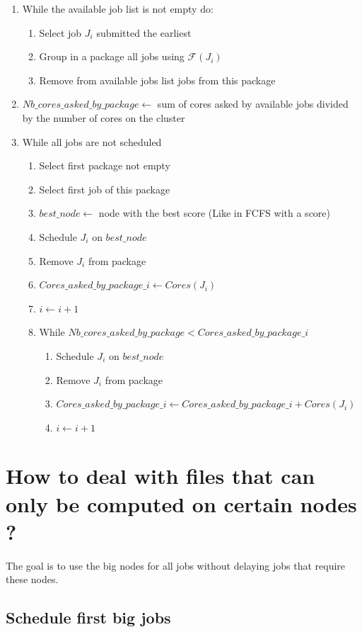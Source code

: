 \documentclass[a4paper]{article}
\newcommand{\inputs}{\ensuremath{\mathcal{F}}\xspace}
\begin{document}
\begin{enumerate}
	\item While the available job list is not empty do:
	\begin{enumerate}
		\item Select job $J_i$ submitted the earliest
		\item Group in a package all jobs using $\inputs(J_i)$
		\item Remove from available jobs list jobs from this package
	\end{enumerate}
	\item $Nb\_cores\_asked\_by\_package \gets $ sum of cores asked by available jobs divided by the number of cores on the cluster
	\item While all jobs are not scheduled
	\begin{enumerate}
		\item Select first package not empty
		\item Select first job of this package
		\item $best\_node \gets$ node with the best score (Like in FCFS with a score)
		\item Schedule $J_i$ on $best\_node$
		\item Remove $J_i$ from package
		\item $Cores\_asked\_by\_package\_i \gets Cores(J_i)$
		\item $i \gets i + 1$
		\item While $Nb\_cores\_asked\_by\_package < Cores\_asked\_by\_package\_i$
		\begin{enumerate}
			\item Schedule $J_{i}$ on $best\_node$
			\item Remove $J_{i}$ from package
			\item $Cores\_asked\_by\_package\_i \gets Cores\_asked\_by\_package\_i + Cores(J_{i})$
			\item $i \gets i + 1$
		\end{enumerate}
	\end{enumerate}
\end{enumerate}

\section{How to deal with files that can only be computed on certain nodes ?}
The goal is to use the big nodes for all jobs without delaying jobs that require these nodes.

\subsection{Schedule first big jobs}
\end{document}
